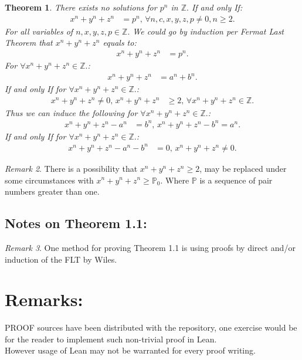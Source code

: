 \documentclass[10pt]{article}
\theoremstyle{plain}
\newtheorem{theorem}{Theorem}[section]
\theoremstyle{definition}
\theoremstyle{remark}
\newtheorem{remark}[theorem]{Remark}
\begin{document}
	\begin{theorem}
		There exists no solutions for $p^{n}$ in $\mathbb{Z}.$ If and only If:
		\begin{align*}
			x^{n} + y^{n} + z^{n} &= p^{n}, \, \forall n, c, x, y, z, p \neq 0, n \geq 2.
		\end{align*}
		For all variables of $n, x, y, z, p \in \mathbb{Z}.$ We could go by induction per Fermat Last Theorem that $x^{n} + y^{n} + z^{n}$ equals to:	
		\begin{align*}
			x^{n} + y^{n} + z^{n} &= p^{n}.
		\end{align*}
		For $\forall x^{n} + y^{n} + z^{n} \in \mathbb{Z}.$:
		\begin{align*}
			x^{n} + y^{n} + z^{n} &= a^{n} + b^{n}.
		\end{align*}
		If and only If for $\forall x^{n} + y^{n} + z^{n} \in \mathbb{Z}.$:
		\begin{align*}
			x^{n} + y^{n} + z^{n} \neq 0, \, x^{n} + y^{n} + z^{n} &\geq 2, \, \forall x^{n} + y^{n} + z^{n} \in \mathbb{Z}.
		\end{align*}
		Thus we can induce the following for $\forall x^{n} + y^{n} + z^{n} \in \mathbb{Z}.$:
		\begin{align*}
			x^{n} + y^{n} + z^{n} -  a^{n} &= b^{n}, \, x^{n} + y^{n} + z^{n} - b^{n} = a^{n}.
		\end{align*}
		If and only If for $\forall x^{n} + y^{n} + z^{n} \in \mathbb{Z}.$:
		\begin{align*}
			x^{n} + y^{n} + z^{n} -  a^{n} - b^{n} &= 0, \, x^{n} + y^{n} + z^{n} \neq 0.
		\end{align*}
	\end{theorem}
	\begin{remark}
		There is a possibility that $x^{n} + y^{n} + z^{n} \geq 2$, may be replaced under some circumstances with $x^{n} + y^{n} + z^{n} \geq \mathbb{P}_{0}.$ Where $\mathbb{P}$ is a sequence of pair numbers greater than one.
	\end{remark}
	\subsection{Notes on Theorem 1.1:}
	\begin{remark}
		One method for proving Theorem 1.1 is using proofs by direct and/or induction of the FLT by Wiles.
	\end{remark}
	\section{Remarks:}
	\lettrine[lines=1, lhang=0.1, loversize=0.2]{P}ROOF sources have been distributed with the repository, one exercise would be for the reader to implement such non-trivial proof in Lean.\\However usage of Lean may not be warranted for every proof writing.
\end{document}
